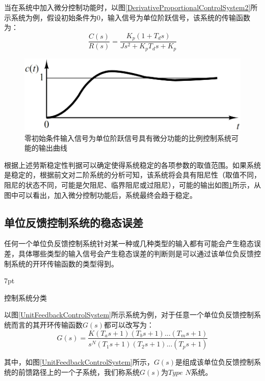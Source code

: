 \documentclass{article}
\numberwithin{equation}{section}
\numberwithin{figure}{section}
\newenvironment{formal}{%
\def\FrameCommand{%
\hspace{1pt}%
{\color{DarkBlue}\vrule width 2pt}%
{\color{formalshade}\vrule width 4pt}%
\colorbox{formalshade}%
}%
\MakeFramed{\advance\hsize-\width\FrameRestore}%
\noindent\hspace{-4.55pt}%
\begin{adjustwidth}{}{7pt}%
\vspace{2pt}\vspace{2pt}%
}
{%
\vspace{2pt}\end{adjustwidth}\endMakeFramed%
}
\begin{document}
当在系统中加入微分控制功能时，以图\ref{DerivativeProportionalControlSystem2}所示系统为例，假设初始条件为0，输入信号为单位阶跃信号，该系统的传输函数为：
\begin{equation}
    \frac{C(s)}{R(s)}=\frac{K_p(1+T_ds)}{Js^2+K_pT_ds+K_p}
\end{equation}

\begin{figure}
    \centering
    \includegraphics[width=.6\textwidth]{Chapter5/OutputDerivativeProportionalControlSystem2.png} %
    \caption{零初始条件输入信号为单位阶跃信号具有微分功能的比例控制系统可能的输出曲线} %
    \label{OutputDerivativeProportionalControlSystem2} %
\end{figure}

根据上述劳斯稳定性判据可以确定使得系统稳定的各项参数的取值范围。如果系统是稳定的，根据前文对二阶系统的分析可知，该系统将会具有阻尼性（取值不同，阻尼的状态不同，可能是欠阻尼、临界阻尼或过阻尼），可能的输出如图\ref{OutputDerivativeProportionalControlSystem2}所示，从图中可以看出，加入微分控制功能后，系统最终会趋于稳定。

\subsection{单位反馈控制系统的稳态误差}
任何一个单位负反馈控制系统针对某一种或几种类型的输入都有可能会产生稳态误差，具体哪些类型的输入信号会产生稳态误差的判断则是可以通过该单位负反馈控制系统的开环传输函数的类型得到。

\begin{formal}
    控制系统分类
\end{formal}

以图\ref{UnitFeedbackControlSystem}所示系统为例，对于任意一个单位负反馈控制系统而言的其开环传输函数$G(s)$都可以改写为：
\begin{equation}
    G(s)=\frac{K(T_as+1)(T_bs+1)...(T_ms+1)}{s^N(T_1s+1)(T_2s+1)...(T_ps+1)}
\end{equation}

其中，如图\ref{UnitFeedbackControlSystem}所示，$G(s)$是组成该单位负反馈控制系统的前馈路径上的一个子系统，我们称系统$G(s)$为$Type$ $N$系统。
\end{document}
